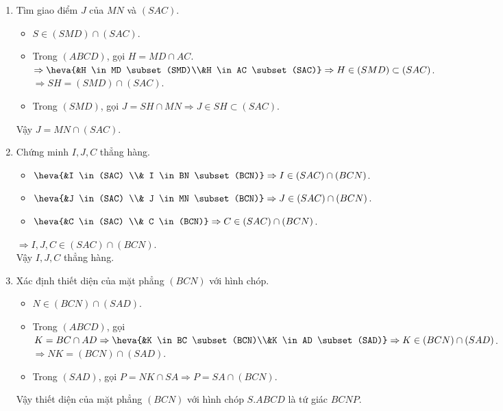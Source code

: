 \begin{bt}
{\begin{enumerate}
\begin{itemize}
				$\Rightarrow SO=(SAC) \cap (SBD)$.\\
				\item Trong $(SBD)$, gọi $I=BN \cap SO \Rightarrow I \in SO \subset (SAC)$.
			\end{itemize}
			Vậy $I=	BN \cap (SAC)$.
			\item Tìm giao điểm $J$ của $MN$ và $(SAC)$.
			\begin{itemize}
				\item $ S \in (SMD) \cap (SAC)$.
				\item  Trong $(ABCD)$, gọi $H=MD \cap AC$.\\
				$ \Rightarrow \heva{&H \in MD \subset (SMD)\\&H \in AC \subset (SAC)}\Rightarrow H \in (SMD) \subset (SAC)$.\\
				$\Rightarrow SH = (SMD) \cap (SAC)$.
				\item  Trong $(SMD)$, gọi $J = SH \cap MN \Rightarrow J \in SH \subset (SAC)$.
			\end{itemize}
			Vậy $J =MN \cap (SAC)$. 
			\item Chứng minh $I, J, C$ thẳng hàng.
			\begin{itemize}
				\item $\heva{&I \in (SAC) \\& I \in BN \subset (BCN)} \Rightarrow I \in (SAC) \cap (BCN)$.
				\item $\heva{&J \in (SAC) \\& J \in MN \subset (BCN)} \Rightarrow J \in (SAC) \cap (BCN)$.
				\item $\heva{&C \in (SAC) \\& C \in  (BCN)} \Rightarrow C \in (SAC) \cap (BCN)$.
			\end{itemize}
			$\Rightarrow I, J, C \in (SAC) \cap (BCN)$.\\
			Vậy $I, J, C$ thẳng hàng.
			\item Xác định thiết diện của mặt phẳng $(BCN)$ với hình chóp.
			\begin{itemize}
				\item $N \in (BCN) \cap (SAD)$.
				\item  Trong $(ABCD)$, gọi $K = BC \cap AD \Rightarrow \heva{&K \in BC \subset (BCN)\\&K \in AD \subset (SAD)} \Rightarrow K \in (BCN) \cap (SAD)$.\\
				$\Rightarrow NK =(BCN) \cap (SAD)$.
				\item Trong $(SAD)$, gọi $P =NK \cap SA \Rightarrow P = SA \cap (BCN)$.
			\end{itemize}
			Vậy thiết diện của mặt phẳng $(BCN)$ với hình chóp $S.ABCD$ là tứ giác $BCNP$.
		\end{enumerate}
	}
\end{bt}
